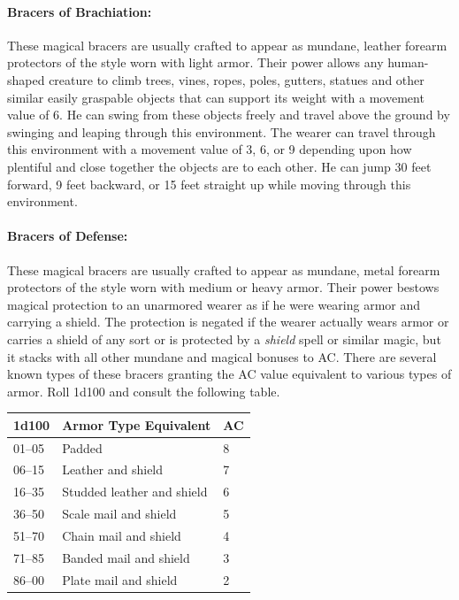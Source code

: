 \begin{multicols}{2}
\paragraph{Bracers of Brachiation:} These magical bracers are usually crafted to appear as mundane, leather forearm protectors of the style worn with light armor.  Their power allows any human-shaped creature to climb trees, vines, ropes, poles, gutters, statues and other similar easily graspable objects that can support its weight with a movement value of 6.  He can swing from these objects freely and travel above the ground by swinging and leaping through this environment.  The wearer can travel through this environment with a movement value of 3, 6, or 9 depending upon how plentiful and close together the objects are to each other.  He can jump 30 feet forward, 9 feet backward, or 15 feet straight up while moving through this environment.

\paragraph{Bracers of Defense:} These magical bracers are usually crafted to appear as mundane, metal forearm protectors of the style worn with medium or heavy armor.  Their power bestows magical protection to an unarmored wearer as if he were wearing armor and carrying a shield.  The protection is negated if the wearer actually wears armor or carries a shield of any sort or is protected by a \textit{shield} spell or similar magic, but it stacks with all other mundane and magical bonuses to AC.  There are several known types of these bracers granting the AC value equivalent to various types of armor.  Roll 1d100 and consult the following table.

\noindent
\begin{tabular}{|p{}|p{}|p{}|}
\hline
1d100	& Armor Type Equivalent	& AC \\
\hline\hline
\rowcolor[gray]{.9}01--05	& Padded 	& 8 \\
06--15	& Leather and shield	& 7 \\
\rowcolor[gray]{.9}16--35	& Studded leather and shield	& 6 \\
36--50	& Scale mail and shield	& 5 \\
\rowcolor[gray]{.9}51--70	& Chain mail and shield	& 4 \\
71--85	& Banded mail and shield	& 3 \\
\rowcolor[gray]{.9}86--00	& Plate mail and shield	& 2 \\
\hline
\end{tabular}


\end{multicols}
